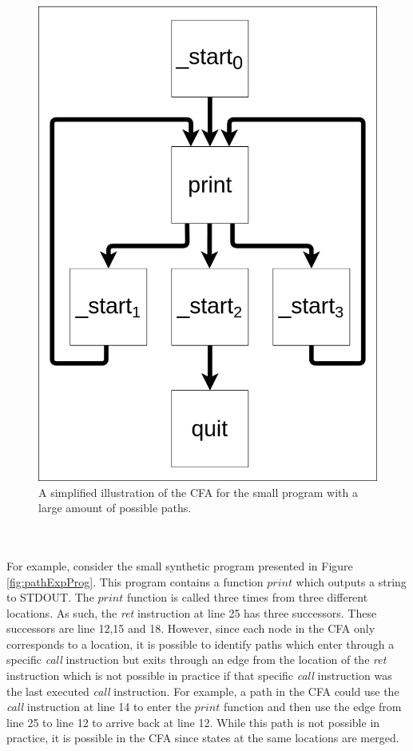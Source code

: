 \documentclass{kththesis}
\renewcommand{\it}[1]{\textit{#1}}
\begin{document}
\begin{figure}[!t]
    \centering
\includegraphics[scale=0.3]{Images/pathExpCFA.png}
    \caption{A simplified illustration of the CFA for the small program with a large amount of possible paths.}
    \label{fig:pathExpCFA}
\end{figure}
\\ \\
For example, consider the small synthetic program presented in Figure \ref{fig:pathExpProg}. This program contains a function $print$ which outputs a string to STDOUT. The $print$ function is called three times from three different locations. As such, the \it{ret} instruction at line 25 has three successors. These successors are line 12,15 and 18. However, since each node in the CFA only corresponds to a location, it is possible to identify paths which enter through a specific \it{call} instruction but exits through an edge from the location of the \it{ret} instruction which is not possible in practice if that specific \it{call} instruction was the last executed \it{call} instruction. For example, a path in the CFA could use the \it{call} instruction at line 14 to enter the $print$ function and then use the edge from line 25 to line 12 to arrive back at line 12. While this path is not possible in practice, it is possible in the CFA since states at the same locations are merged.
\end{document}
